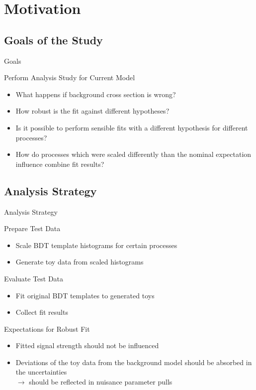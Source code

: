 \section{Motivation}

\subsection{Goals of the Study}
\begin{frame}{Goals}
\begin{block}{Perform Analysis Study for Current Model}
\begin{itemize}
\item What happens if background cross section is wrong?
\item How robust is the fit against different hypotheses?
\item Is it possible to perform sensible fits with a different hypothesis for different processes?
\item How do processes which were scaled differently than the nominal expectation influence combine fit results?
\end{itemize}
\end{block}

\end{frame}

\subsection{Analysis Strategy}

\begin{frame}{Analysis Strategy}
\begin{block}{Prepare Test Data}
\begin{itemize}
\item Scale BDT template histograms for certain processes
\item Generate toy data from scaled histograms
\end{itemize}
\end{block}

\begin{block}{Evaluate Test Data}
\begin{itemize}
\item Fit original BDT templates to generated toys
\item Collect fit results
\end{itemize}
\end{block}

\begin{block}{Expectations for Robust Fit}
\begin{itemize}
\item Fitted signal strength should not be influenced
\item Deviations of the toy data from the background model should be absorbed in the uncertainties\\
$\rightarrow$ should be reflected in nuisance parameter pulls
\end{itemize}
\end{block}

\end{frame}